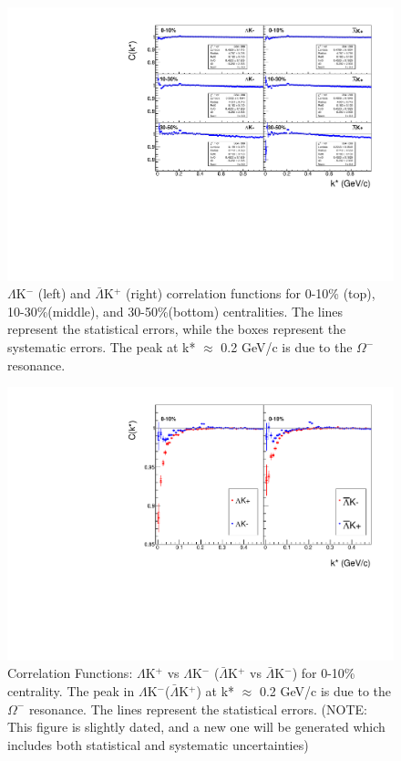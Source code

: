 \documentclass[../AnalysisNoteJBuxton.tex]{subfiles}
\begin{document}
\begin{figure}[h]
  \centering
  \includegraphics[width=\textwidth]{4_CorrelationFunctions/Figures/canKStarCfsLamKchMwConj.pdf}
  \caption[$\Lambda$K$^{-}$ and $\bar{\Lambda}$K$^{+}$ Correlation Functions]{$\Lambda$K$^{-}$ (left) and $\bar{\Lambda}$K$^{+}$ (right) correlation functions for 0-10\% (top), 10-30\%(middle), and 30-50\%(bottom) centralities.  The lines represent the statistical errors, while the boxes represent the systematic errors.  The peak at k* $\approx$ 0.2 GeV/c is due to the $\Omega^{-}$ resonance.}
  \label{fig:LamKchMwConjCfs}
\end{figure}

\begin{figure}[h]
  \centering
  \includegraphics[width=\textwidth]{4_CorrelationFunctions/Figures/canLamKchPvsLamKchM0010.pdf}
  \caption[Correlation Functions: $\Lambda$K$^{+}$ vs $\Lambda$K$^{-}$ for 0-10\% Centrality]{Correlation Functions: $\Lambda$K$^{+}$ vs $\Lambda$K$^{-}$ ($\bar{\Lambda}$K$^{+}$ vs $\bar{\Lambda}$K$^{-}$) for 0-10\% centrality.  The peak in $\Lambda$K$^{-}$($\bar{\Lambda}$K$^{+}$) at k* $\approx$ 0.2 GeV/c is due to the $\Omega^{-}$ resonance.  The lines represent the statistical errors. (NOTE: This figure is slightly dated, and a new one will be generated which includes both statistical and systematic uncertainties)}
  \label{fig:cLamcKchCfs0010}
\end{figure}
\end{document}
